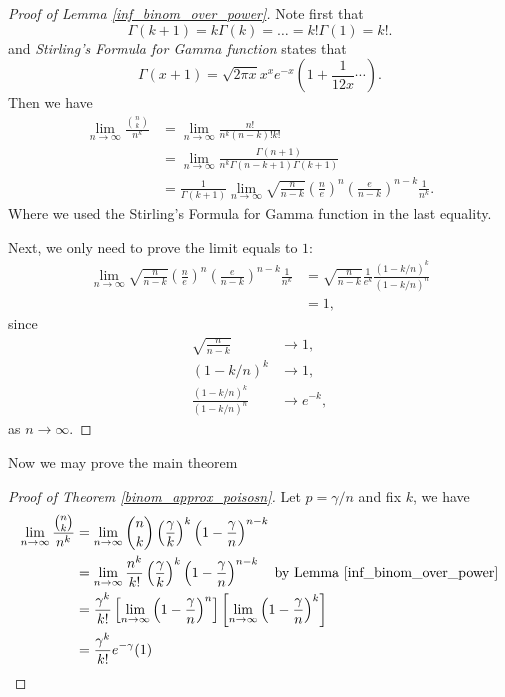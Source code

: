 \documentclass[10pt]{article}
\theoremstyle{remark}
\theoremstyle{plain}
\numberwithin{equation}{section}
\begin{document}
\begin{proof}[Proof of Lemma \ref{inf_binom_over_power}]
	Note first that
		\[
			\Gamma(k+1) = k \Gamma(k) = \dots = k!\Gamma(1) = k!.
		\]
	and \textit{Stirling's Formula for Gamma function} states that
		\[
			\Gamma(x+1) = \sqrt{2\pi x} x^x e^{-x} \left(1 + \frac{1}{12x} \cdots \right).
		\]
	Then we have
	\begin{align*}
		\lim_{n \to \infty} \frac{\binom{n}{k}}{n^k} & = \lim_{n \to \infty} \frac{n!}{n^k (n-k)! k!}
		\\
		& =  \lim_{n \to \infty} \frac{\Gamma(n+1)}{n^k \Gamma(n-k+1) \Gamma(k+1)}
		\\
		& =  \frac{1}{\Gamma(k+1)}\lim_{n \to \infty} \sqrt{\frac{n}{n-k}} \left(\frac{n}{e}\right)^n \left(\frac{e}{n-k}\right)^{n-k} \frac{1}{n^k}.
	\end{align*}
	Where we used the Stirling's Formula for Gamma function in the last equality.
	
	Next, we only need to prove the limit equals to $1$:
	\begin{align*}
		\lim_{n \to \infty} \sqrt{\frac{n}{n-k}} \left(\frac{n}{e}\right)^n \left(\frac{e}{n-k}\right)^{n-k} \frac{1}{n^k} & = \sqrt{\frac{n}{n-k}} \frac{1}{e^k} \frac{(1-k/n)^k}{(1-k/n)^n}
		\\
		& = 1, 
	\end{align*}
	since
	\begin{align*}
		\sqrt{\frac{n}{n-k}} & \to 1,\\
		(1-k/n)^k &\to 1,\\
		\frac{(1-k/n)^k}{(1-k/n)^n} &\to e^{-k},
	\end{align*}
	as $n \to \infty$.
\end{proof}
Now we may prove the main theorem
\begin{proof}[Proof of Theorem \ref{binom_approx_poisosn}]
	Let $ p = \gamma/n$ and fix $k$, we have
	\begin{align*}
		\lim_{n \to \infty} \frac{\binom{n}{k}}{n^k} & = \lim_{n \to \infty} \binom{n}{k} \left(\frac{\gamma}{k}\right)^k\left(1 - \frac{\gamma}{n}\right)^{n-k}
		\\
		& = \lim_{n \to \infty} \frac{n^k}{k!} \left(\frac{\gamma}{k}\right)^k \left( 1 - \frac{\gamma}{n} \right)^{n-k} \quad \text{by Lemma \ref{inf_binom_over_power}}
		\\
		& = \frac{\gamma^k}{k!} \left[ \lim_{n \to \infty} \left(1 - \frac{\gamma}{n}\right)^n \right] \left[\lim_{n \to \infty} \left(1 - \frac{\gamma}{n}\right)^k \right]
		\\
		& = \frac{\gamma^k}{k!} e^{-\gamma} ( 1)
	\end{align*}
\end{proof}
\end{document}
